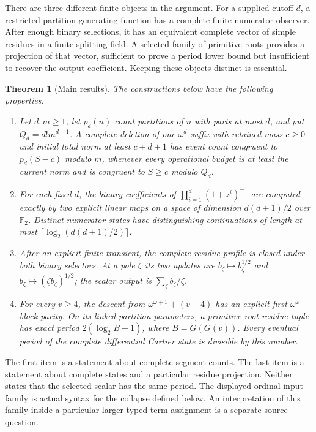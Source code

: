 \documentclass[11pt,a4paper]{article}
\newtheorem{theorem}{Theorem}[section]
\theoremstyle{definition}
\newcommand{\Ftwo}{\mathbb F_2}
\numberwithin{equation}{section}
\begin{document}
There are three different finite objects in the argument. For a supplied
cutoff $d$, a restricted-partition generating function has a complete
finite numerator observer. After enough binary selections, it has an
equivalent complete vector of simple residues in a finite splitting
field. A selected family of primitive roots provides a projection of
that vector, sufficient to prove a period lower bound but insufficient
to recover the output coefficient. Keeping these objects distinct is
essential.

\begin{theorem}[Main results]\label{thm:main}
The constructions below have the following properties.
\begin{enumerate}
\item Let $d,m\ge1$, let $p_d(n)$ count partitions of $n$ with parts at most $d$, and
put $Q_d=d!m^{d-1}$. A complete deletion of one $\omega^d$ suffix
with retained mass $c\ge0$ and initial total norm at least $c+d+1$
has event count congruent to $p_d(S-c)$ modulo
$m$, whenever every operational budget is at least the current norm
and is congruent to $S\ge c$ modulo $Q_d$.
\item For each fixed $d$, the binary coefficients of
$\prod_{i=1}^d(1+z^i)^{-1}$ are computed exactly by two explicit
linear maps on a space of dimension $d(d+1)/2$ over $\Ftwo$.
Distinct numerator states have distinguishing continuations of length
at most $\lceil\log_2(d(d+1)/2)\rceil$.
\item After an explicit finite transient, the complete residue profile
is closed under both binary selectors. At a pole $\zeta$ its two
updates are $b_\zeta\mapsto b_\zeta^{1/2}$ and
$b_\zeta\mapsto(\zeta b_\zeta)^{1/2}$; the scalar output is
$\sum_\zeta b_\zeta/\zeta$.
\item For every $v\ge4$, the descent from
$\omega^{\omega+1}+(v-4)$ has an explicit first
$\omega^\omega$-block parity. On its linked partition parameters,
a primitive-root residue tuple has exact period
$2(\log_2 B-1)$, where $B=G(G(v))$.
Every eventual period of the complete differential Cartier state
is divisible by this number.
\end{enumerate}
\end{theorem}

The first item is a statement about complete segment counts. The last
item is a statement about complete states and a particular residue
projection. Neither states that the selected scalar has the same period.
The displayed ordinal input family is actual syntax for the collapse
defined below. An interpretation of this family inside a particular
larger typed-term assignment is a separate source question.
\end{document}

